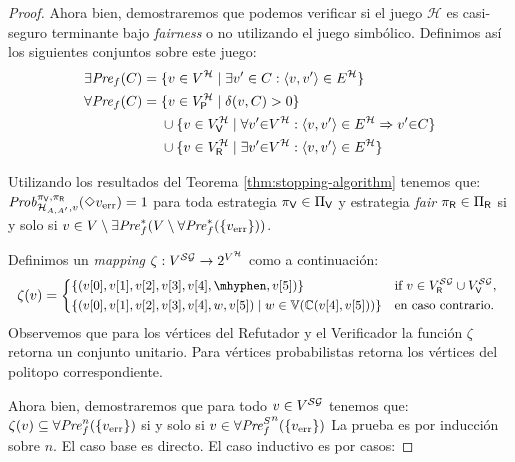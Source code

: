 \begin{proof}
Ahora bien, demostraremos que podemos verificar si el juego $\mathcal{H}$ es casi-seguro terminante bajo \emph{fairness} o no utilizando el juego simbólico. Definimos así los siguientes conjuntos sobre este juego:
\begin{align*}
  \exists\mathit{Pre}_f(C) = {}&\{ v \in V^{\mathcal{H}} \mid\exists v' \in C : \langle v,v' \rangle \in E^\mathcal{H} \} \\
  \forall\mathit{Pre}_f(C) = {}&\{ v \in V^{\mathcal{H}}_{\mathsf{P}} \mid \delta(v,C)>0\} \\
                       & \cup \{ v \in  V^{\mathcal{H}}_{\mathsf{V}} \mid \forall v' {\in} V^{\mathcal{H}} : \langle v,v' \rangle \in E^{\mathcal{H}} \Rightarrow v' {\in} C \} \\
                     & \cup \{v \in V^{\mathcal{H}}_{\mathsf{R}} \mid \exists v'{\in} V^{\mathcal{H}} : \langle v,v' \rangle \in E^\mathcal{H} \} 
\end{align*}

Utilizando los resultados del Teorema \ref{thm:stopping-algorithm} tenemos que: 
 $\mathit{Prob}^{\pi_{\mathsf{V}}, \pi_{\mathsf{R}}}_{\mathcal{H}_{A,A'},v}(\Diamond v_{\text{err}}) = 1$ para toda estrategia 
 $\pi_{\mathsf{V}} \in \Pi_{\mathsf{V}}$ y estrategia \emph{fair} $\pi_{\mathsf{R}} \in \Pi_{\mathsf{R}}$
  si y solo si $v \in V\setminus \exists\mathit{Pre}_f^*(V \setminus \forall\mathit{Pre}_f^*(\{ v_{\text{err}} \}))$.
    
 Definimos un \emph{mapping} $\zeta : V^{\mathcal{SG}} \rightarrow 2^{V^{\mathcal{H}}}$ como a continuación:
 \[\small
     \zeta(v) = 
                    \begin{cases*}
                         \{(\pr{0}{v},\pr{1}{v},\pr{2}{v},\pr{3}{v},\pr{4}{v},\mhyphen, \pr{5}{v} )\} & if  $v \in V^{\SymbG}_\Refuter \cup V^{\SymbG}_\Verifier$, \\
                         \{ (\pr{0}{v},\pr{1}{v},\pr{2}{v},\pr{3}{v},\pr{4}{v},w, \pr{5}{v}) \mid w \in \vertices{\couplings{\pr{4}{v}}{\pr{5}{v}}}\} & en caso contrario.
                    \end{cases*}
 \]   
 Observemos que para los vértices del Refutador y el Verificador la función $\zeta$ retorna un conjunto unitario.  Para vértices probabilistas retorna los vértices del politopo correspondiente.
 
  Ahora bien, demostraremos que para todo $v \in V^{\mathcal{SG}}$  tenemos que:  $\zeta(v) \subseteq  \forall\mathit{Pre}_f^n(\{ v_{\text{err}} \})$ si y solo si $v \in {\forall\mathit{Pre}^S_f}^n(\{ v_{\text{err}} \})$
  La prueba es por inducción sobre $n$. El caso base es directo. El caso inductivo es por casos:
 

\end{proof}
